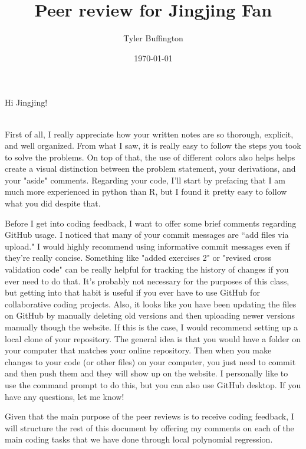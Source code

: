 \documentclass[10pt]{article}
\begin{document}
    \title{Peer review for Jingjing Fan}
    \author{Tyler Buffington}
    \date{\today}
    \maketitle

\raggedright 

Hi Jingjing! \\
\ 

First of all, I really appreciate how your written notes are so thorough, explicit, and well organized. From what I saw, it is really easy to follow the steps you took to solve the problems.  On top of that, the use of different colors also helps helps create a visual distinction between the problem statement, your derivations, and your "aside" comments. Regarding your code, I'll start by prefacing that I am much more experienced in python than R, but I found it pretty easy to follow what you did despite that. 

Before I get into coding feedback, I want to offer some brief comments regarding GitHub usage. I noticed that many of your commit messages are ``add files via upload." I would highly recommend using informative commit messages even if they're really concise. Something like "added exercises 2" or "revised cross validation code" can be really helpful for tracking the history of changes if you ever need to do that. It's probably not necessary for the purposes of this class, but getting into that habit is useful if you ever have to use GitHub for collaborative coding projects. Also, it looks like you have been updating the files on GitHub by manually deleting old versions and then uploading newer versions manually though the website. If this is the case, I would recommend setting up a local clone of your repository. The general idea is that you would have a folder on your computer that matches your online repository. Then when you make changes to your code (or other files) on your computer, you just need to commit and then push them and they will show up on the website. I personally like to use the command prompt to do this, but you can also use GitHub desktop. If you have any questions, let me know!

Given that the main purpose of the peer reviews is to receive coding feedback, I will structure the rest of this document by offering my comments on each of the main coding tasks that we have done through local polynomial regression.
\end{document}
